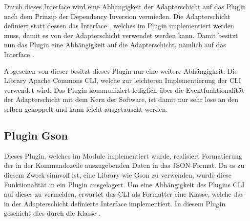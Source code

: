 Durch dieses Interface wird eine Abhängigkeit der Adapterschicht auf das Plugin nach dem Prinzip der Dependency Inversion vermieden. Die Adapterschicht definiert statt dessen das Interface \href{https://github.com/anditru/quickie/blob/bb41442c7f1ffbfcd3117cd86a40f7932e543a33/1-quickie-adapters/src/main/java/org/pinkcrazyunicorn/quickie/adapters/UI.java}{}, welches im Plugin implementiert werden muss, damit es von der Adapterschicht verwendet werden kann. Damit besitzt nun das Plugin eine Abhängigkeit auf die Adapterschicht, nämlich auf das Interface \href{https://github.com/anditru/quickie/blob/bb41442c7f1ffbfcd3117cd86a40f7932e543a33/1-quickie-adapters/src/main/java/org/pinkcrazyunicorn/quickie/adapters/UI.java}{}. 

Abgesehen von dieser besitzt dieses Plugin nur eine weitere Abhängigkeit: Die Library Apache Commons CLI, welche zur leichteren Implementierung der \ac{CLI} verwendet wird. Das Plugin kommuniziert lediglich über die Eventfunktionalität der Adapterschicht mit dem Kern der Software, ist damit nur sehr lose an den selben gekoppelt und kann leicht ausgetauscht werden.

\subsection{Plugin Gson}
Dieses Plugin, welches im Module \href{https://github.com/anditru/quickie/tree/bb41442c7f1ffbfcd3117cd86a40f7932e543a33/0-quickie-plugin-gson}{} implementiert wurde, realisiert Formatierung der in der Kommandozeile auszugebenden Daten in das JSON-Format. Da es zu diesem Zweck sinnvoll ist, eine Library wie Gson zu verwenden, wurde diese Funktionalität in ein Plugin ausgelagert. Um eine Abhängigkeit des Plugins \acs{CLI} auf dieses zu vermeiden, erwartet das \ac{CLI} als Formatter eine Klasse, welche das in der Adapterschicht definierte Interface  implementiert. In diesem Plugin geschieht dies durch die Klasse .

